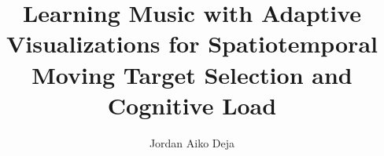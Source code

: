 \documentclass[manuscript,screen]{acmart}
\begin{document}
\title{Learning Music with Adaptive Visualizations for Spatiotemporal Moving Target Selection and Cognitive Load}

\author{Jordan Aiko Deja}


\end{document}
